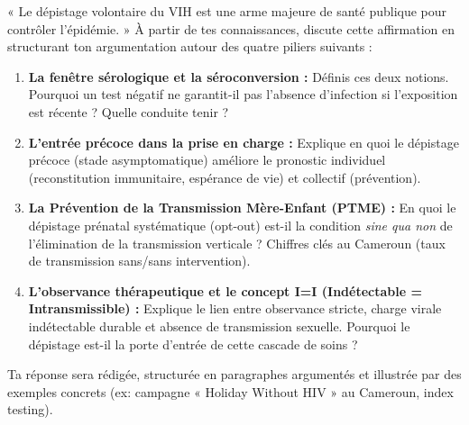 \documentclass[11pt]{article}
\begin{document}
\begin{exercice}
« Le dépistage volontaire du VIH est une arme majeure de santé publique pour contrôler l'épidémie. »
À partir de tes connaissances, discute cette affirmation en structurant ton argumentation autour des quatre piliers suivants :
\begin{enumerate}
    \item \textbf{La fenêtre sérologique et la séroconversion :} Définis ces deux notions. Pourquoi un test négatif ne garantit-il pas l'absence d'infection si l'exposition est récente ? Quelle conduite tenir ?
    \item \textbf{L'entrée précoce dans la prise en charge :} Explique en quoi le dépistage précoce (stade asymptomatique) améliore le pronostic individuel (reconstitution immunitaire, espérance de vie) et collectif (prévention).
    \item \textbf{La Prévention de la Transmission Mère-Enfant (PTME) :} En quoi le dépistage prénatal systématique (opt-out) est-il la condition \emph{sine qua non} de l'élimination de la transmission verticale ? Chiffres clés au Cameroun (taux de transmission sans/sans intervention).
    \item \textbf{L'observance thérapeutique et le concept I=I (Indétectable = Intransmissible) :} Explique le lien entre observance stricte, charge virale indétectable durable et absence de transmission sexuelle. Pourquoi le dépistage est-il la porte d'entrée de cette cascade de soins ?
\end{enumerate}
Ta réponse sera rédigée, structurée en paragraphes argumentés et illustrée par des exemples concrets (ex: campagne « Holiday Without HIV » au Cameroun, index testing).
\end{exercice}
\end{document}
